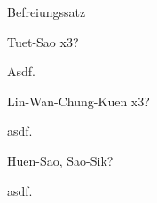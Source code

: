 
\begin{WTSatz}{Befreiungssatz}%
	\begin{WTSatzTeil}{Tuet-Sao x3}{?}
		
		Asdf.
	\end{WTSatzTeil}
	\begin{WTSatzTeil}{Lin-Wan-Chung-Kuen x3}{?}
		
		asdf.
	\end{WTSatzTeil}
	\begin{WTSatzTeil}{Huen-Sao, Sao-Sik}{?}
		
		asdf.
	\end{WTSatzTeil}
\end{WTSatz}







